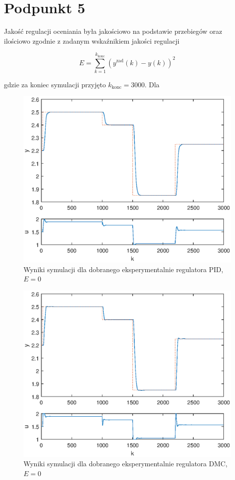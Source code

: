 \chapter{Podpunkt 5}
Jakość regulacji oceniania była jakościowo na podstawie przebiegów oraz ilościowo zgodnie z zadanym wskaźnikiem jakości regulacji

\begin{equation}
E = \sum_{k=1}^{k_{\mathrm{konc}}}(y^{\mathrm{zad}}(k) - y(k))^2
\label{E}
\end{equation}

gdzie za koniec symulacji przyjęto $k_{\mathrm{konc}}=3000$. Dla

\begin{figure}[ht]
\centering
\includegraphics[scale=1]{images/Z5manualPID}
\caption{Wyniki symulacji dla dobranego eksperymentalnie regulatora PID, $E=\num{0}$}
\label{Z5manualPID}
\end{figure}


\begin{figure}[ht]
\centering
\includegraphics[scale=1]{images/Z5manualDMC}
\caption{Wyniki symulacji dla dobranego eksperymentalnie regulatora DMC, $E=\num{0}$}
\label{Z5manualDMC}
\end{figure}

